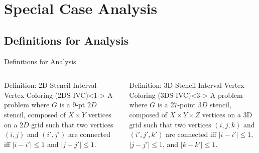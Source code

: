 \section{Special Case Analysis}

\subsection{Definitions for Analysis}

\begin{frame}{Definitions for Analysis}
  \begin{overlayarea}{\textwidth}{.8\textheight}
    \begin{columns}[T]

      \begin{column}{0.5\textwidth}
        \begin{block}{Definition: 2D Stencil Interval Vertex Coloring (2DS-IVC)}<1->
          A problem where \( G \) is a \( 9 \)-pt \( 2D \) stencil, 
          composed of \( X \times Y \) vertices on a \( 2D \) grid such that two vertices \( (i, j) \) 
          and \( (i', j') \) are connected iff \( |i - i'| \leq 1 \) and \( |j - j'| \leq 1 \).
        \end{block}
        \centering
      \end{column}

      \begin{column}{0.5\textwidth}
        \begin{block}{Definition: 3D Stencil Interval Vertex Coloring (3DS-IVC)}<3->
          A problem where \( G \) is a 27-point \( 3D \) stencil, 
          composed of \(X \times Y \times Z\) vertices on a 3D grid such that two vertices 
          \( (i, j, k) \) and \( (i', j', k') \) are connected iff \( |i - i'| \leq 1 \), \( |j - j'| \leq 1 \), and
          \( |k - k'| \leq 1 \).
        \end{block}
        \centering
      \end{column}

    \end{columns}
  \end{overlayarea}
\end{frame}

